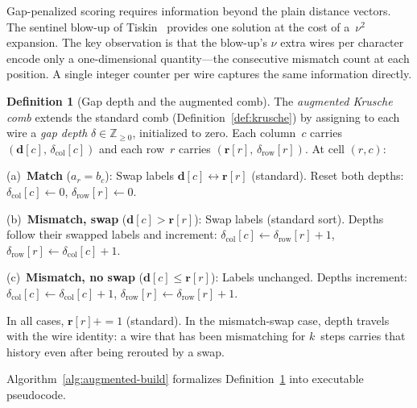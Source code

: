 \documentclass[11pt, a4paper]{article}
\theoremstyle{definition}
\newtheorem{definition}[theorem]{Definition}
\theoremstyle{remark}
\newcommand{\dcol}{\mathbf{d}}
\newcommand{\drow}{\mathbf{r}}
\begin{document}
Gap-penalized scoring requires information beyond the plain distance
vectors.
The sentinel blow-up of Tiskin~\cite{tiskin2008semi}
provides one solution at the cost of a~$\nu^2$ expansion.
The key
observation is that the blow-up's $\nu$ extra wires per character
encode only a one-dimensional quantity---the consecutive mismatch
count at each position.
A single integer counter per wire captures
the same information directly.

\begin{definition}[Gap depth and the augmented comb]
\label{def:augmented-comb}
The \emph{augmented Krusche comb} extends the standard comb
(Definition~\ref{def:krusche}) by assigning to each wire a
\emph{gap depth} $\delta \in \mathbb{Z}_{\geq 0}$, initialized
to zero.
Each column~$c$ carries
$(\dcol[c],\, \delta_{\mathrm{col}}[c])$ and each row~$r$ carries
$(\drow[r],\, \delta_{\mathrm{row}}[r])$.  At cell $(r, c)$:

\noindent
(a)~\textbf{Match} ($a_r = b_c$): Swap labels
$\dcol[c] \leftrightarrow \drow[r]$ (standard).
Reset both
depths: $\delta_{\mathrm{col}}[c] \leftarrow 0$,
$\delta_{\mathrm{row}}[r] \leftarrow 0$.

\noindent
(b)~\textbf{Mismatch, swap} ($\dcol[c] > \drow[r]$): Swap labels
(standard sort).
Depths follow their swapped labels and
increment:
$\delta_{\mathrm{col}}[c] \leftarrow \delta_{\mathrm{row}}[r]+1$,
$\delta_{\mathrm{row}}[r] \leftarrow \delta_{\mathrm{col}}[c]+1$.

\noindent
(c)~\textbf{Mismatch, no swap} ($\dcol[c] \leq \drow[r]$):
Labels unchanged.
Depths increment:
$\delta_{\mathrm{col}}[c] \leftarrow \delta_{\mathrm{col}}[c]+1$,
$\delta_{\mathrm{row}}[r] \leftarrow \delta_{\mathrm{row}}[r]+1$.

\noindent
In all cases, $\drow[r] \mathrel{{+}{=}} 1$ (standard).
In the mismatch-swap case, depth travels with the wire identity:
a wire that has been mismatching for $k$~steps carries that history
even after being rerouted by a swap.
\end{definition}

Algorithm~\ref{alg:augmented-build} formalizes Definition~\ref{def:augmented-comb} into executable pseudocode.
\end{document}
